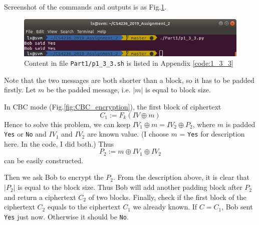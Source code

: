 Screenshot of the commands and outputs is as Fig.\ref{fig:p1_3_3}.

\begin{figure}[tb!]
\centering
\includegraphics[width=\columnwidth]{pictures/p1_3_3.png}
\caption{
    Content in file \texttt{Part1/p1\_3\_3.sh} is listed in Appendix \ref{code:1_3_3}
}
\label{fig:p1_3_3}
\end{figure}

Note that the two messages are both shorter than a block, so it has to be padded firstly. Let $m$ be the padded message, i.e. $|m|$ is equal to block size.

In CBC mode (Fig.\ref{fig:CBC_encryption}), the first block of ciphertext $$ C_1 := F_k(IV \oplus m) $$
Hence to solve this problem, we can keep $IV_1 \oplus m = IV_2 \oplus P_2$, where $m$ is padded \texttt{Yes} or \texttt{No} and $IV_1$ and $IV_2$ are known value. (I choose $m$ = \texttt{Yes} for description here. In the code, I did both.) Thus $$ P_2 := m \oplus IV_1 \oplus IV_2 $$ can be easily constructed. 

Then we ask Bob to encrypt the $P_2$. From the description above, it is clear that $|P_2|$ is equal to the block size. Thus Bob will add another padding block after $P_2$ and return a ciphertext $C_2$ of two blocks.
Finally, check if the first block of the ciphertext $C_2$ equals to the ciphertext $C_1$ we already known. If $C = C_1$, Bob sent \texttt{Yes} just now. Otherwise it should be \texttt{No}.
